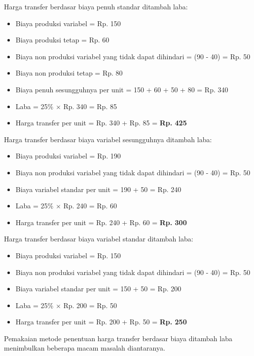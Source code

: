 \begin{enumerate}
	Harga transfer berdasar biaya penuh standar ditambah laba:

	\begin{itemize}
		\item Biaya produksi variabel = Rp. 150
		\item Biaya produksi tetap = Rp. 60
		\item Biaya non produksi variabel yang tidak dapat dihindari = (90 - 40) = Rp. 50
		\item Biaya non produksi tetap = Rp. 80
		\item Biaya penuh sesungguhnya per unit = 150 + 60 + 50 + 80 = Rp. 340
		\item Laba = 25\% $\times$ Rp. 340 = Rp. 85
		\item Harga transfer per unit = Rp. 340 + Rp. 85 = \textbf{Rp. 425}
	\end{itemize}

	Harga transfer berdasar biaya variabel sesungguhnya ditambah laba:

	\begin{itemize}
		\item Biaya produksi variabel = Rp. 190
		\item Biaya non produksi variabel yang tidak dapat dihindari = (90 - 40) = Rp. 50
		\item Biaya variabel standar per unit = 190 + 50 = Rp. 240
		\item Laba = 25\% $\times$ Rp. 240 = Rp. 60
		\item Harga transfer per unit = Rp. 240 + Rp. 60 = \textbf{Rp. 300}
	\end{itemize}

	Harga transfer berdasar biaya variabel standar ditambah laba:

	\begin{itemize}
		\item Biaya produksi variabel = Rp. 150
		\item Biaya non produksi variabel yang tidak dapat dihindari = (90 - 40) = Rp. 50
		\item Biaya variabel standar per unit = 150 + 50 = Rp. 200
		\item Laba = 25\% $\times$ Rp. 200 = Rp. 50
		\item Harga transfer per unit = Rp. 200 + Rp. 50 = \textbf{Rp. 250}
	\end{itemize}

	Pemakaian metode penentuan harga transfer berdasar biaya ditambah laba menimbulkan beberapa macam masalah diantaranya.


\end{enumerate}
